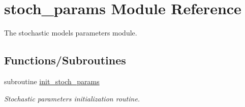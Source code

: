 \hypertarget{namespacestoch__params}{}\section{stoch\+\_\+params Module Reference}
\label{namespacestoch__params}


The stochastic models parameters module.  


\subsection*{Functions/\+Subroutines}
\begin{DoxyCompactItemize}
\item 
subroutine \hyperlink{namespacestoch__params_ae4aee571fa90316e794b67d1d404c0aa}{init\+\_\+stoch\+\_\+params}
\begin{DoxyCompactList}\small\item\em Stochastic parameters initialization routine. \end{DoxyCompactList}\end{DoxyCompactItemize}
